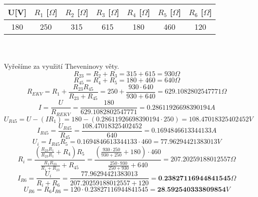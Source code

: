 \documentclass{article}
\begin{document}
\begin{tabular}{| c | c | c | c | c | c | c |}
  \hline
   U[V] & $R_{1}$ [$\Omega$] & $R_{2}$ [$\Omega$]& $R_{3}$ [$\Omega$]& $R_{4}$ [$\Omega$]& $R_{5}$ [$\Omega$]& $R_{6}$ [$\Omega$]\\
  \hline
  180 & 250 & 315 & 615 & 180 & 460 & 120\\
  \hline
\end{tabular}\\
\\
Vyřešíme za využití Theveninovy věty.\\
\[
  R_{23} = R_{2} + R_{3} = 315 + 615 = 930 \Omega
\]
\[
  R_{45} = R_4 + R_5 = 180 + 460 = 640 \Omega
\]
\[
  R_{EKV} = R_1 + \displaystyle\frac{R_{23}R_{45}}{R_{23}+R_{45}}
  = 250 + \displaystyle\frac{930 \cdot 640}{930 + 640}
  = 629.1082802547771 \Omega
\]
\[
  I = \displaystyle\frac{U}{R_{REKV}}
  = \displaystyle\frac{180}{629.1082802547771}
  = 0.28611926698390194A
\]
\[
  U_{R45} = U - (I R_1)
  = 180 - (0.28611926698390194\cdot 250)
  = 108.47018325402452 V
\]
\[
  I_{R45} = \displaystyle\frac{U_{R45}}{R_{45}}
  = \displaystyle\frac{108.47018325402452}{640}
  = 0.1694846613344133 A
\]
\[
  U_i = I_{R45} R_5
  = 0.1694846613344133 \cdot 460
  = 77.96294421383013 V
\]
\[
  R_i = \displaystyle\frac{(\displaystyle\frac{R_{23}R_{1}}{R_{23}R_1}+R_4)R_5}{
    \displaystyle\frac{R_1 R_{23}}{R_1 + R_{23}}+R_{45}
  }
  = \displaystyle\frac{(\displaystyle\frac{930\cdot 250}{930+250}+180)\cdot 460}{
    \displaystyle\frac{250 \cdot 930}{250 + 930}+640
  }
  = 207.20259188012557 \Omega
\]
\[
  I_{R6} = \displaystyle\frac{U_i}{R_i + R_6}
  = \displaystyle\frac{77.96294421383013}{207.20259188012557 + 120}
  = \textbf{0.23827116944841545}\Omega
\]
\[
  U_{R6} = R_6 I_{R6}
  = 120 \cdot 0.23827116944841545 
  = \textbf{28.592540333809854}V
\]
\end{document}
